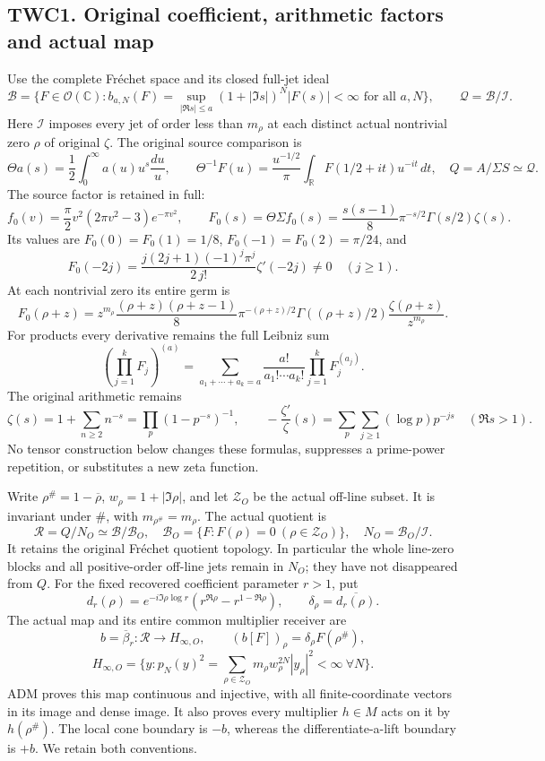 \subsection{TWC1. Original coefficient, arithmetic factors and actual
map}\label{twc1.-original-coefficient-arithmetic-factors-and-actual-map}

Use the complete Fréchet space and its closed full-jet ideal \[
\mathcal B=\{F\in\mathcal O(\mathbb C): b_{a,N}(F)=\sup_{|\Re s|\le a}(1+|\Im s|)^N|F(s)|<\infty\text{ for all }a,N\},
\qquad \mathcal Q=\mathcal B/\mathcal I.
\tag{TWC1.1}
\] Here \(\mathcal I\) imposes every jet of order less than \(m_\rho\)
at each distinct actual nontrivial zero \(\rho\) of original \(\zeta\).
The original source comparison is \[
\Theta a(s)=\frac12\int_0^\infty a(u)u^s\frac{du}{u},\qquad
\Theta^{-1}F(u)=\frac{u^{-1/2}}\pi\int_{\mathbb R}F(1/2+it)u^{-it}\,dt,
\quad Q=A/\Sigma S\simeq\mathcal Q.
\tag{TWC1.2}
\] The source factor is retained in full: \[
f_0(v)=\frac\pi2v^2(2\pi v^2-3)e^{-\pi v^2},\qquad
F_0(s)=\Theta\Sigma f_0(s)=\frac{s(s-1)}8\pi^{-s/2}\Gamma(s/2)\zeta(s).
\tag{TWC1.3}
\] Its values are \(F_0(0)=F_0(1)=1/8\), \(F_0(-1)=F_0(2)=\pi/24\), and
\[
F_0(-2j)=\frac{j(2j+1)(-1)^j\pi^j}{2\,j!}\zeta'(-2j)\ne0\quad(j\ge1).
\tag{TWC1.4}
\] At each nontrivial zero its entire germ is \[
F_0(\rho+z)=z^{m_\rho}\frac{(\rho+z)(\rho+z-1)}8
\pi^{-(\rho+z)/2}\Gamma((\rho+z)/2)
\frac{\zeta(\rho+z)}{z^{m_\rho}}.
\tag{TWC1.5}
\] For products every derivative remains the full Leibniz sum \[
\left(\prod_{j=1}^k F_j\right)^{(a)}
=\sum_{a_1+\cdots+a_k=a}\frac{a!}{a_1!\cdots a_k!}
\prod_{j=1}^kF_j^{(a_j)}.
\tag{TWC1.6}
\] The original arithmetic remains \[
\zeta(s)=1+\sum_{n\ge2}n^{-s}=\prod_p(1-p^{-s})^{-1},\qquad
-\frac{\zeta'}\zeta(s)=\sum_p\sum_{j\ge1}(\log p)p^{-js}\quad(\Re s>1).
\tag{TWC1.7}
\] No tensor construction below changes these formulas, suppresses a
prime-power repetition, or substitutes a new zeta function.

Write \(\rho^\#=1-\overline\rho\), \(w_\rho=1+|\Im\rho|\), and let
\(\mathscr Z_O\) be the actual off-line subset. It is invariant under
\(\#\), with \(m_{\rho^\#}=m_\rho\). The actual quotient is \[
\mathcal R=Q/N_O\simeq\mathcal B/\mathcal B_O,
\quad \mathcal B_O=\{F:F(\rho)=0\ (\rho\in\mathscr Z_O)\},
\quad N_O=\mathcal B_O/\mathcal I.
\tag{TWC1.8}
\] It retains the original Fréchet quotient topology. In particular the
whole line-zero blocks and all positive-order off-line jets remain in
\(N_O\); they have not disappeared from \(Q\). For the fixed recovered
coefficient parameter \(r>1\), put \[
d_r(\rho)=e^{-i\Im\rho\log r}(r^{\Re\rho}-r^{1-\Re\rho}),
\qquad \delta_\rho=\overline{d_r(\rho)}.
\tag{TWC1.9}
\] The actual map and its entire common multiplier receiver are \[
b=\overline\beta_r:\mathcal R\longrightarrow H_{\infty,O},\qquad
(b[F])_\rho=\delta_\rho F(\rho^\#),
\] \[
H_{\infty,O}=\{y:p_N(y)^2=\sum_{\rho\in\mathscr Z_O}m_\rho w_\rho^{2N}|y_\rho|^2<\infty\ \forall N\}.
\tag{TWC1.10}
\] ADM proves this map continuous and injective, with all
finite-coordinate vectors in its image and dense image. It also proves
every multiplier \(h\in M\) acts on it by \(h(\rho^\#)\). The local cone
boundary is \(-b\), whereas the differentiate-a-lift boundary is \(+b\).
We retain both conventions.

